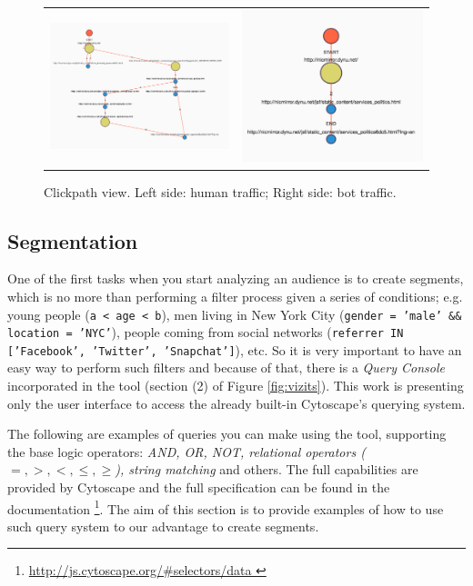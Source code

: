 \documentclass[preprint,12pt,3p]{elsarticle}
\begin{document}
\begin{figure}[H]
\begin{tabular}{cc}
		\includegraphics[width = 0.45\columnwidth]{screenshots/clickpath_human_3} &
		\includegraphics[width = 0.45\columnwidth]{screenshots/clickpath_bots_3} \\
	\end{tabular}
	\caption{
		Clickpath view. Left side: human traffic; Right side: bot traffic.
		\label{fig:clickpath_humans_vs_bots}
	}
\end{figure}

\subsection{Segmentation}
\label{sec:segmentation}
One of the first tasks when you start analyzing an audience is to create segments, which is no more than performing a filter process given a series of conditions;
e.g. young people (\texttt{a < age < b}), men living in New York City (\texttt{gender = 'male' \&\& location = 'NYC'}), people coming from social networks (\texttt{referrer IN ['Facebook', 'Twitter', 'Snapchat']}), etc. So it is very important to have an easy way to perform such filters and because of that, there is a \textit{Query Console} incorporated in the tool (section (2) of Figure \ref{fig:vizits}). This work is presenting only the user interface to access the already built-in Cytoscape's querying system.

The following are examples of queries you can make using the tool, supporting the base logic operators: \textit{AND, OR, NOT, relational operators ($=, >, <, \leq, \geq$), string matching} and others. The full capabilities are provided by Cytoscape and the full specification can be found in the documentation \footnote{\url{ http://js.cytoscape.org/\#selectors/data }}. The aim of this section is to provide examples of how to use such query system to our advantage to create segments.
\end{document}
